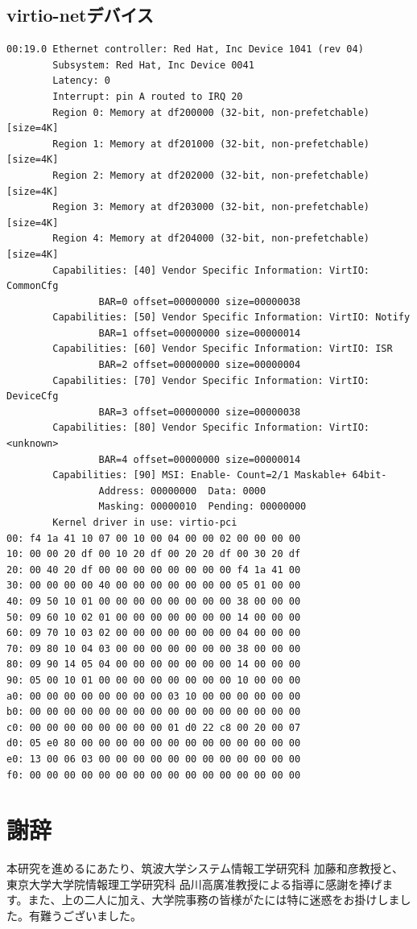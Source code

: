 \documentclass[a4paper,11pt,report]{ltjsbook}
\begin{document}
\section{virtio-netデバイス}
\small
\begin{verbatim}
00:19.0 Ethernet controller: Red Hat, Inc Device 1041 (rev 04)
        Subsystem: Red Hat, Inc Device 0041
        Latency: 0
        Interrupt: pin A routed to IRQ 20
        Region 0: Memory at df200000 (32-bit, non-prefetchable) [size=4K]
        Region 1: Memory at df201000 (32-bit, non-prefetchable) [size=4K]
        Region 2: Memory at df202000 (32-bit, non-prefetchable) [size=4K]
        Region 3: Memory at df203000 (32-bit, non-prefetchable) [size=4K]
        Region 4: Memory at df204000 (32-bit, non-prefetchable) [size=4K]
        Capabilities: [40] Vendor Specific Information: VirtIO: CommonCfg
                BAR=0 offset=00000000 size=00000038
        Capabilities: [50] Vendor Specific Information: VirtIO: Notify
                BAR=1 offset=00000000 size=00000014
        Capabilities: [60] Vendor Specific Information: VirtIO: ISR
                BAR=2 offset=00000000 size=00000004
        Capabilities: [70] Vendor Specific Information: VirtIO: DeviceCfg
                BAR=3 offset=00000000 size=00000038
        Capabilities: [80] Vendor Specific Information: VirtIO: <unknown>
                BAR=4 offset=00000000 size=00000014
        Capabilities: [90] MSI: Enable- Count=2/1 Maskable+ 64bit-
                Address: 00000000  Data: 0000
                Masking: 00000010  Pending: 00000000
        Kernel driver in use: virtio-pci
00: f4 1a 41 10 07 00 10 00 04 00 00 02 00 00 00 00
10: 00 00 20 df 00 10 20 df 00 20 20 df 00 30 20 df
20: 00 40 20 df 00 00 00 00 00 00 00 00 f4 1a 41 00
30: 00 00 00 00 40 00 00 00 00 00 00 00 05 01 00 00
40: 09 50 10 01 00 00 00 00 00 00 00 00 38 00 00 00
50: 09 60 10 02 01 00 00 00 00 00 00 00 14 00 00 00
60: 09 70 10 03 02 00 00 00 00 00 00 00 04 00 00 00
70: 09 80 10 04 03 00 00 00 00 00 00 00 38 00 00 00
80: 09 90 14 05 04 00 00 00 00 00 00 00 14 00 00 00
90: 05 00 10 01 00 00 00 00 00 00 00 00 10 00 00 00
a0: 00 00 00 00 00 00 00 00 03 10 00 00 00 00 00 00
b0: 00 00 00 00 00 00 00 00 00 00 00 00 00 00 00 00
c0: 00 00 00 00 00 00 00 00 01 d0 22 c8 00 20 00 07
d0: 05 e0 80 00 00 00 00 00 00 00 00 00 00 00 00 00
e0: 13 00 06 03 00 00 00 00 00 00 00 00 00 00 00 00
f0: 00 00 00 00 00 00 00 00 00 00 00 00 00 00 00 00
\end{verbatim}

\chapter{謝辞}

本研究を進めるにあたり、筑波大学システム情報工学研究科 加藤和彦教授と、東京大学大学院情報理工学研究科 品川高廣准教授による指導に感謝を捧げます。また、上の二人に加え、大学院事務の皆様がたには特に迷惑をお掛けしました。有難うございました。


\end{document}
